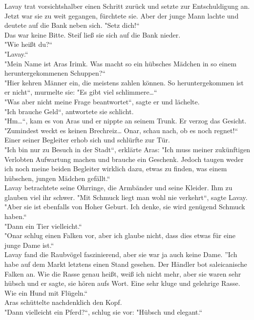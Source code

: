Lavay trat vorsichtshalber einen Schritt zurück und setzte zur Entschuldigung an. Jetzt war sie zu 
weit gegangen, fürchtete sie. Aber der junge Mann lachte und deutete auf die Bank neben sich. "Setz 
dich!``\\
Das war keine Bitte. Steif ließ sie sich auf die Bank nieder.\\
"Wie heißt du?``\\
"Lavay.``\\
"Mein Name ist Aras Irimk. Was macht so ein hübsches Mädchen in so einem heruntergekommenen 
Schuppen?``\\
"Hier kehren Männer ein, die meistens zahlen können. So heruntergekommen ist er nicht``, murmelte 
sie: "Es gibt viel schlimmere…``\\
"Was aber nicht meine Frage beantwortet``, sagte er und lächelte.\\
"Ich brauche Geld``, antwortete sie schlicht.\\
"Hm…``, kam es von Aras und er nippte an seinem Trunk. Er verzog das Gesicht. "Zumindest weckt es 
keinen Brechreiz… Onar, schau nach, ob es noch regnet!``\\
Einer seiner Begleiter erhob sich und schlürfte zur Tür.\\
"Ich bin nur zu Besuch in der Stadt``, erklärte Aras: "Ich muss meiner zukünftigen Verlobten 
Aufwartung machen und brauche ein Geschenk. Jedoch taugen weder ich noch meine beiden Begleiter 
wirklich dazu, etwas zu finden, was einem hübschen, jungen Mädchen gefällt.``\\
Lavay betrachtete seine Ohrringe, die Armbänder und seine Kleider. Ihm zu glauben viel ihr 
schwer. "Mit Schmuck liegt man wohl nie verkehrt``, sagte Lavay.\\
"Aber sie ist ebenfalls von Hoher Geburt. Ich denke, sie wird genügend Schmuck haben.``\\
"Dann ein Tier vielleicht.``\\
"Onar schlug einen Falken vor, aber ich glaube nicht, dass dies etwas für eine junge Dame ist.``\\
Lavay fand die Raubvögel faszinierend, aber sie war ja auch keine Dame. ''Ich habe auf dem Markt 
letztens einen Stand gesehen. Der Händler bot saleicanische Falken an. Wie die Rasse genau heißt, 
weiß ich nicht mehr, aber sie waren sehr hübsch und er sagte, sie hören aufs Wort. Eine sehr kluge 
und gelehrige Rasse. Wie ein Hund mit Flügeln.``\\
Aras schüttelte nachdenklich den Kopf.\\
"Dann vielleicht ein Pferd?``, schlug sie vor: "Hübsch und elegant.``
